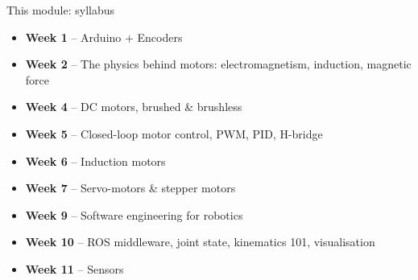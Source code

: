 \documentclass[compress]{beamer}
\begin{document}
\begin{frame}{This module: syllabus}

\begin{itemize}
    \item<+-> \textbf{Week 1} -- Arduino + Encoders
    \item<+-> \textbf{Week 2} -- The physics behind motors: electromagnetism, induction, magnetic
        force
    \item<+-> \textbf{Week 4} -- DC motors, brushed \& brushless
    \item<+-> \textbf{Week 5} -- Closed-loop motor control, PWM, PID, H-bridge
    \item<+-> \textbf{Week 6} -- Induction motors
    \item<+-> \textbf{Week 7} -- Servo-motors \& stepper motors
    \item<+-> \textbf{Week 9} -- Software engineering for robotics
    \item<+-> \textbf{Week 10} -- ROS middleware, joint state, kinematics 101, visualisation
    \item<+-> \textbf{Week 11} -- Sensors
\end{itemize}

\end{frame}
\end{document}
